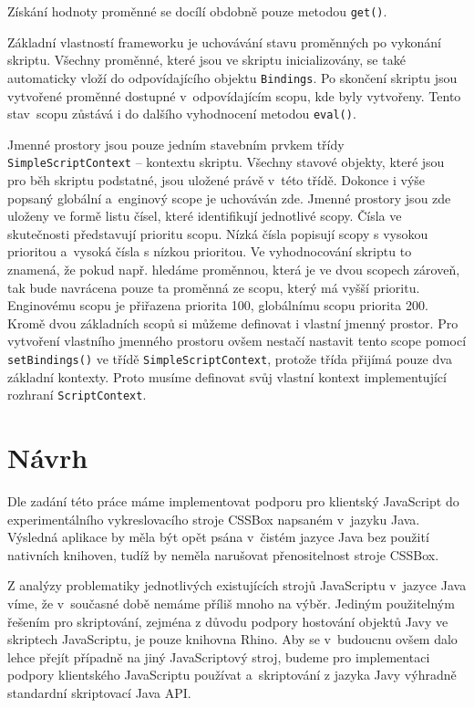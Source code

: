 Získání hodnoty proměnné se docílí obdobně pouze metodou \texttt{get()}.

Základní vlastností frameworku je uchovávání stavu proměnných po vykonání skriptu. Všechny proměnné, které jsou ve skriptu inicializovány, se také automaticky vloží do odpovídajícího objektu \texttt{Bindings}. Po skončení skriptu jsou vytvořené proměnné dostupné v~odpovídajícím scopu, kde byly vytvořeny. Tento stav~scopu zůstává i do dalšího vyhodnocení metodou \texttt{eval()}.

Jmenné prostory jsou pouze jedním stavebním prvkem třídy \texttt{SimpleScriptContext} -- kontextu skriptu. Všechny stavové objekty, které jsou pro běh skriptu podstatné, jsou uložené právě v~této třídě. Dokonce i výše popsaný globální a~enginový scope je uchováván zde. Jmenné prostory jsou zde uloženy ve formě listu čísel, které identifikují jednotlivé scopy. Čísla ve skutečnosti představují prioritu scopu. Nízká čísla popisují scopy s vysokou prioritou a~vysoká čísla s nízkou prioritou. Ve vyhodnocování skriptu to znamená, že pokud např. hledáme proměnnou, která je ve dvou scopech zároveň, tak bude navrácena pouze ta proměnná ze scopu, který má vyšší prioritu. Enginovému scopu je přiřazena priorita 100, globálnímu scopu priorita 200. Kromě dvou základních scopů si můžeme definovat i vlastní jmenný prostor. Pro vytvoření vlastního jmenného prostoru ovšem nestačí nastavit tento scope pomocí \texttt{setBindings()} ve třídě \texttt{SimpleScriptContext}, protože třída přijímá pouze dva základní kontexty. Proto musíme definovat svůj vlastní kontext implementující rozhraní \texttt{ScriptContext}.

\chapter{Návrh}
\label{Chapter.Design}

Dle zadání této práce máme implementovat podporu pro klientský JavaScript do experimentálního vykreslovacího stroje CSSBox napsaném v~jazyku Java. Výsledná aplikace by měla být opět psána v~čistém jazyce Java bez použití nativních knihoven, tudíž by neměla narušovat přenositelnost stroje CSSBox.

Z  analýzy problematiky jednotlivých existujících strojů JavaScriptu v~jazyce Java víme, že v~současné době nemáme příliš mnoho na výběr. Jediným použitelným řešením pro skriptování, zejména z důvodu podpory hostování objektů Javy ve skriptech JavaScriptu, je pouze knihovna Rhino. Aby se v~budoucnu ovšem dalo lehce přejít případně na jiný JavaScriptový stroj, budeme pro implementaci podpory klientského JavaScriptu používat a~skriptování z jazyka Javy výhradně standardní skriptovací Java API.

